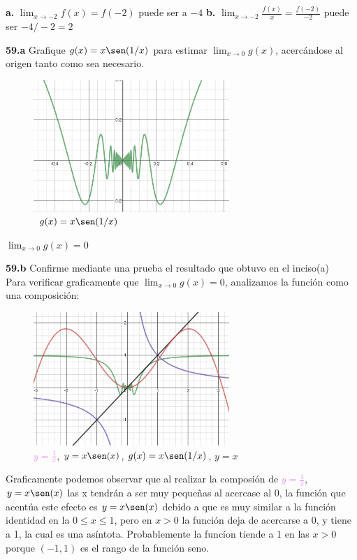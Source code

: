 \documentclass[12pt, letterpaper]{article}
\begin{document}
\textbf{a.} $\lim_{x \to -2} f(x) = f(-2)$ puede ser a $-4$
\textbf{b.} $\lim_{x \to -2} \frac{f(x)}{x} = \frac{f(-2)}{-2}$ puede ser $-4/-2 = 2$

\textbf{59.a} Grafique $g(x) = x \sen (1/x)$ para estimar $\lim_{x \to 0} g(x)$, acercándose al origen tanto como sea necesario.\\
\begin{figure}[ht]
\centering
\includegraphics[width=20em]{t9tres}
\caption{\ \textcolor{green}{$g(x) = x \sen (1/x)$}}
\end{figure}
$\lim_{x \to 0} g(x) = 0$
\newpage

\textbf{59.b} Confirme mediante una prueba el resultado que obtuvo en el inciso(a)\\
Para verificar graficamente que  $\lim_{x \to 0} g(x) = 0$, analizamos la función como una composición:

\begin{figure}[ht]
\centering
\includegraphics[width=20em]{t9cuatro}
\caption{\textcolor{violet}{$y = \frac{1}{x}$}, \textcolor{red}{$y = x\sen (x)$}, \textcolor{green}{$g(x) = x \sen (1/x)$}, $y =x$}
\end{figure}

Graficamente podemos observar que al realizar la composión de \textcolor{violet}{$y = \frac{1}{x}$}, \textcolor{red}{$y = x\sen (x)$} las x tendrán a ser muy pequeñas al acercase al 0, la función que acentúa este efecto es \textcolor{red}{$y = x\sen (x)$} debido a que es muy similar a la función identidad en la $0 \leq x \leq 1$, pero en $x > 0$ la función deja de acercarse a 0, y tiene a 1, la cual es una asíntota. Probablemente la funcíon tiende a 1 en las $x > 0$ porque $(-1,1)$ es el rango de la función seno.
\end{document}
